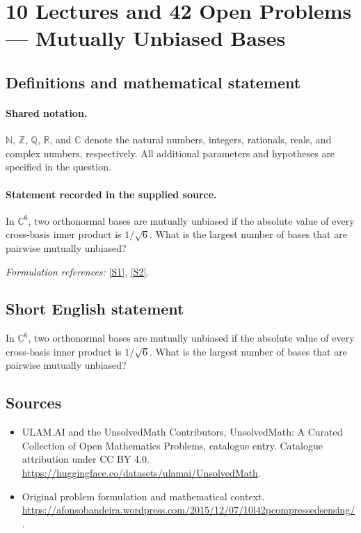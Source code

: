 \documentclass[11pt]{article}
\newcommand{\sref}[2]{\hyperlink{source:#1:#2}{[S#2]}}
\begin{document}
\section{10 Lectures and 42 Open Problems — Mutually Unbiased Bases}\label{statement}

\subsection{Definitions and mathematical statement}

\paragraph{Shared notation.}$\mathbb N$, $\mathbb Z$, $\mathbb Q$, $\mathbb R$, and $\mathbb C$ denote the natural numbers, integers, rationals, reals, and complex numbers, respectively. All additional parameters and hypotheses are specified in the question.


\paragraph{Statement recorded in the supplied source.}
In $\mathbb C^6$, two orthonormal bases are mutually unbiased if the absolute value of every cross-basis inner product is $1/\sqrt6$. What is the largest number of bases that are pairwise mutually unbiased?
\par\smallskip\textit{Formulation references:} \sref{statement}{1}, \sref{statement}{2}.
\subsection{Short English statement}
In $\mathbb C^6$, two orthonormal bases are mutually unbiased if the absolute value of every cross-basis inner product is $1/\sqrt6$. What is the largest number of bases that are pairwise mutually unbiased?
\subsection{Sources}
\begin{itemize}
\item[\hypertarget{source:statement:1}{S1}] ULAM.AI and the UnsolvedMath Contributors, UnsolvedMath: A Curated Collection of Open Mathematics Problems, catalogue entry. Catalogue attribution under CC BY 4.0.
\url{https://huggingface.co/datasets/ulamai/UnsolvedMath}.
\item[\hypertarget{source:statement:2}{S2}] Original problem formulation and mathematical context.
\url{https://afonsobandeira.wordpress.com/2015/12/07/10l42pcompressedsensing/}.
\end{itemize}
\label{end:statement}
\end{document}
